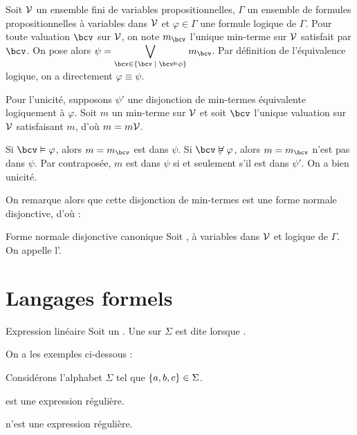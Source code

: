 \documentclass[a4paper,french,bookmarks]{book}
\begin{document}
    \begin{nproof}
        Soit $\mathcal{V}$ un ensemble fini de variables propositionnelles, $\Gamma$ un ensemble de formules propositionnelles à variables dans $\mathcal{V}$ et $\varphi \in \Gamma$ une formule logique de $\Gamma$. Pour toute valuation $\bcv$ sur $\mathcal{V}$, on note $m_\bcv$ l'unique min-terme sur $\mathcal{V}$ satisfait par $\bcv$. On pose alors $\psi = \displaystyle\bigvee_{\bcv \in \ens{\bcv \enstq \bcv \vDash \phi}} m_\bcv$. Par définition de l'équivalence logique, on a directement $\varphi \equiv \psi$.\medskip
        
        Pour l'unicité, supposons $\psi'$ une disjonction de min-termes équivalente logiquement à $\varphi$. Soit $m$ un min-terme sur $\mathcal{V}$ et soit $\bcv$ l'unique valuation sur $\mathcal{V}$ satisfaisant $m$, d'où $m = m\mathcal{V}$. 
        
        Si $\bcv \vDash \varphi$, alors $m = m_\bcv$ est dans $\psi$. Si $\bcv \not\vDash \varphi$, alors $m = m_\bcv$ n'est pas dans $\psi$. Par contraposée, $m$ est dans $\psi$ si et seulement s'il est dans $\psi'$. On a bien unicité.
    \end{nproof}
    On remarque alors que cette disjonction de min-termes est une forme normale disjonctive, d'où :
    \begin{definition}{Forme normale disjonctive canonique}{}
        Soit ,  à variables dans $\mathcal{V}$ et  logique de $\Gamma$. On appelle  l'.
    \end{definition}
    
    \chapter{Langages formels}
    
    
    
    \begin{definition}{Expression linéaire}{}
        Soit \hg{$\Sigma$} un . Une  sur $\Sigma$ est dite  lorsque .
    \end{definition}
    
    On a les exemples ci-dessous :
    \begin{example}{}{}
        Considérons l'alphabet $\Sigma$ tel que $\left\{a, b, c\right\} \in \Sigma$.
        \begin{enumerate}
            \itt {} est une expression régulière.
            
            \itt {} n'est  une expression régulière.
        \end{enumerate}
    \end{example}
    
\end{document}
